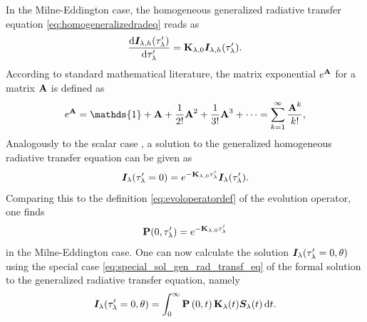 \documentclass[a4paper,12pt]{report}
\def\lk#1{{\color{black}{#1}}}
\begin{document}
In the Milne-Eddington case, the homogeneous generalized radiative transfer equation \cref{eq:homogeneralizedradeq} reads as \begin{equation}
\frac{\mathrm{d}\bm{I}_{\lambda,h}(\tau_\lambda^\prime)}{\mathrm{d}\tau_\lambda^\prime} = \boldsymbol{\mathbf{K}}_{\lambda,0}\bm{I}_{\lambda,h}(\tau_\lambda^\prime).
\end{equation} According to standard mathematical literature, the matrix exponential $e^{\boldsymbol{\mathbf{A}}}$ for a matrix $\boldsymbol{\mathbf{A}}$ is defined as \begin{equation}
e^{\matr{A}} = \mathds{1} + \matr{A} + \frac{1}{2!}\matr{A}^2 + \frac{1}{3!}\matr{A}^3 + \dots = \sum_{k=1}^{\infty}\frac{\matr{A}^k}{k!},
\end{equation} Analogously to the scalar case \lk{therefore}, a solution to the generalized homogeneous radiative transfer equation can be given as \begin{equation}
\bm{I}_\lambda(\tau_\lambda^\prime = 0) = e^{-\boldsymbol{\mathbf{K}}_{\lambda,0}\tau_\lambda^\prime}\bm{I}_\lambda(\tau_\lambda^\prime).
\end{equation} Comparing this to the definition \cref{eq:evoloperatordef} of the evolution operator, one finds \begin{equation}
\boldsymbol{\mathbf{P}}(0,\tau_\lambda^\prime) = e^{-\boldsymbol{\mathbf{K}}_{\lambda,0}\tau_\lambda^\prime}
\end{equation} in the Milne-Eddington case. One can now calculate the solution $\bm{I}_\lambda(\tau_\lambda^\prime=0, \theta)$ using the special case \cref{eq:special_sol_gen_rad_transf_eq} of the formal solution to the generalized radiative transfer equation, namely 
\begin{equation}
\bm{I}_\lambda(\tau_\lambda^\prime = 0,\theta) = \int_{0}^{ \infty}\boldsymbol{\mathbf{P}}\left(0,t\right)\boldsymbol{\mathbf{K}}_\lambda(t)\bm{S}_\lambda(t)\,\mathrm{d}t.
\end{equation}
\end{document}
